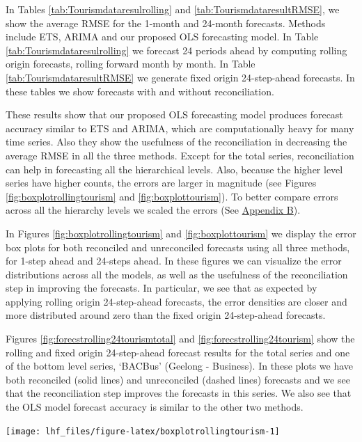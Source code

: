 \documentclass[11pt,a4paper,]{article}
\let\origfigure\figure
\let\endorigfigure\endfigure
\renewenvironment{figure}[1][2] {
    \expandafter\origfigure\expandafter[!htbp]
} {
    \endorigfigure
}
\begin{document}
In Tables \ref{tab:Tourismdataresulrolling} and
\ref{tab:TourismdataresultRMSE}, we show the average RMSE for the
1-month and 24-month forecasts. Methods include ETS, ARIMA and our
proposed OLS forecasting model. In Table
\ref{tab:Tourismdataresulrolling} we forecast 24 periods ahead by
computing rolling origin forecasts, rolling forward month by month. In
Table \ref{tab:TourismdataresultRMSE} we generate fixed origin
24-step-ahead forecasts. In these tables we show forecasts with and
without reconciliation.

These results show that our proposed OLS forecasting model produces
forecast accuracy similar to ETS and ARIMA, which are computationally
heavy for many time series. Also they show the usefulness of the
reconciliation in decreasing the average RMSE in all the three methods.
Except for the total series, reconciliation can help in forecasting all
the hierarchical levels. Also, because the higher level series have
higher counts, the errors are larger in magnitude (see Figures
\ref{fig:boxplotrollingtourism} and \ref{fig:boxplottourism}). To better
compare errors across all the hierarchy levels we scaled the errors (See
\protect\hyperlink{appendixB}{Appendix B}).

In Figures \ref{fig:boxplotrollingtourism} and \ref{fig:boxplottourism}
we display the error box plots for both reconciled and unreconciled
forecasts using all three methods, for 1-step ahead and 24-steps ahead.
In these figures we can visualize the error distributions across all the
models, as well as the usefulness of the reconciliation step in
improving the forecasts. In particular, we see that as expected by
applying rolling origin 24-step-ahead forecasts, the error densities are
closer and more distributed around zero than the fixed origin
24-step-ahead forecasts.

Figures \ref{fig:forecstrolling24tourismtotal} and
\ref{fig:forecstrolling24tourism} show the rolling and fixed origin
24-step-ahead forecast results for the total series and one of the
bottom level series, `BACBus' (Geelong - Business). In these plots we
have both reconciled (solid lines) and unreconciled (dashed lines)
forecasts and we see that the reconciliation step improves the forecasts
in this series. We also see that the OLS model forecast accuracy is
similar to the other two methods.

\begin{figure}

{\centering \texttt{[image: lhf\_files/figure-latex/boxplotrollingtourism-1]} 

}

\caption{Box plots of forecast errors from reconciled and unreconciled ETS, ARIMA and OLS methods at each hierarchical level for rolling origin 24-step-ahead tourism demand.}\label{fig:boxplotrollingtourism}
\end{figure}
\end{document}
